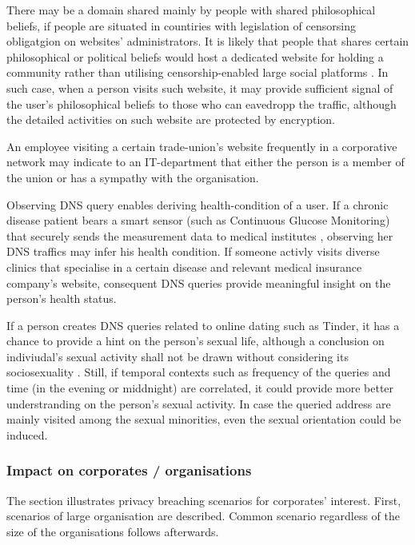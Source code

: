 There may be a domain shared mainly by people with shared philosophical beliefs, if people are situated in countiries with legislation of censorsing obligatgion on websites' administrators.
It is likely that people that shares certain philosophical or political beliefs would host a dedicated website for holding a community rather than utilising censorship-enabled large social platforms \cite{mackinnon2009china}.
In such case, when a person visits such website, it may provide sufficient signal of the user's philosophical beliefs to those who can eavedropp the traffic, although the detailed activities on such website are protected by encryption.

An employee visiting a certain trade-union's website frequently in a corporative network may indicate to an IT-department that either the person is a member of the union or has a sympathy with the organisation. 

Observing DNS query enables deriving health-condition of a user. If a chronic disease patient bears a smart sensor (such as Continuous Glucose Monitoring) that securely sends the measurement data to medical institutes \cite{carelink-uploading, medtronic-watson}, observing her DNS traffics may infer his health condition.
If someone activly visits diverse clinics that specialise in a certain disease and relevant medical insurance company's website, consequent DNS queries provide meaningful insight on the person's health status.

If a person creates DNS queries related to online dating such as Tinder, it has a chance to provide a hint on the person's sexual life, although a conclusion on indiviudal's sexual activity shall not be drawn without considering its sociosexuality \cite{sevi2018exploring}. Still, if temporal contexts such as frequency of the queries and time (in the evening or middnight) are correlated, it could provide more better understranding on the person's sexual activity.
In case the queried address are mainly visited among the sexual minorities, even the sexual orientation could be induced.

\subsubsection{Impact on corporates / organisations}
The section illustrates privacy breaching scenarios for corporates' interest. First, scenarios of large organisation are described. Common scenario regardless of the size of the organisations follows afterwards.

